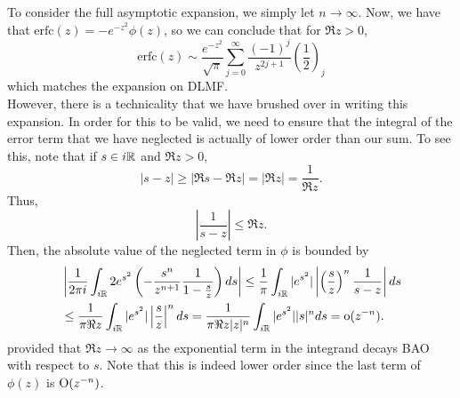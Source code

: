 \documentclass{article}
\begin{document}
To consider the full asymptotic expansion, we simply let $n\to\infty$. Now, we have that $\mathrm{erfc}(z) = - e^{-z^2} \phi(z)$, so we can conclude that for $\Re z > 0$,
\[
\mathrm{erfc}(z)\sim\frac{e^{-z^2}}{\sqrt{\pi}}\sum_{j=0}^{\infty} \frac{(-1)^j}{z^{2j+1}}\left(\frac{1}{2}\right)_j
\]
which matches the expansion on DLMF. \\
However, there is a technicality that we have brushed over in writing this expansion. In order for this to be valid, we need to ensure that the integral of the error term that we have neglected is actually of lower order than our sum. To see this, note that if $s\in i\mathbb{R}$ and $\Re z>0$, 
\[
|s-z|\geq|\Re s-\Re z|=|\Re z|=\frac{1}{\Re z}.
\]
Thus,
\[
\left|\frac{1}{s-z}\right|\leq \Re z.
\]
Then, the absolute value of the neglected term in $\phi$ is bounded by
\begin{align*}
&\left|\frac{1}{2\pi i} \int_{i \mathbb R} 2e^{s^2} \left(-\frac{s^n}{z^{n+1}} \frac{1}{1-\frac s z}\right)d s\right|\leq\frac{1}{\pi } \int_{i \mathbb R} |e^{s^2}| \left|\left(\frac{s}{z}\right)^n \frac{1}{s-z}\right|d s\\&\leq
\frac{1}{\pi\Re z}\int_{i \mathbb R} |e^{s^2}| \left|\frac{s}{z}\right|^nds=\frac{1}{\pi\Re z|z|^n}\int_{i \mathbb R} |e^{s^2}||s|^nds=\operatorname{o}(z^{-n}).
\end{align*}
provided that $\Re z\to\infty$ as the exponential term in the integrand decays BAO with respect to $s$. Note that this is indeed lower order since the last term of $\phi(z)$ is $\operatorname{O}(z^{-n})$.
\end{document}
